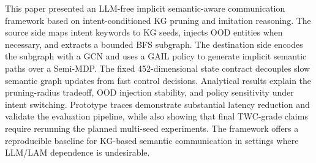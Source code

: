 \documentclass[journal]{IEEEtran}
\begin{document}
This paper presented an LLM-free implicit semantic-aware communication framework based on intent-conditioned KG pruning and imitation reasoning. The source side maps intent keywords to KG seeds, injects OOD entities when necessary, and extracts a bounded BFS subgraph. The destination side encodes the subgraph with a GCN and uses a GAIL policy to generate implicit semantic paths over a Semi-MDP. The fixed 452-dimensional state contract decouples slow semantic graph updates from fast control decisions. Analytical results explain the pruning-radius tradeoff, OOD injection stability, and policy sensitivity under intent switching. Prototype traces demonstrate substantial latency reduction and validate the evaluation pipeline, while also showing that final TWC-grade claims require rerunning the planned multi-seed experiments. The framework offers a reproducible baseline for KG-based semantic communication in settings where LLM/LAM dependence is undesirable.



\end{document}
